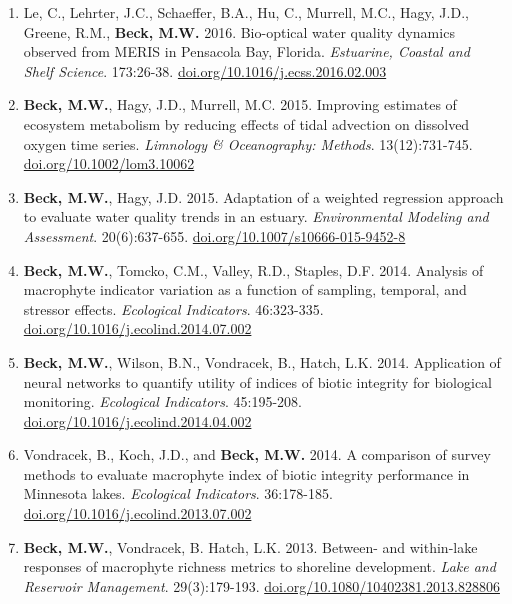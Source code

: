 \documentclass[letterpaper,12pt]{article}
\begin{document}
\begin{enumerate}
\item Le, C., Lehrter, J.C., Schaeffer, B.A., Hu, C., Murrell, M.C., Hagy, J.D., Greene, R.M., \textbf{Beck, M.W.} 2016. Bio-optical water quality dynamics observed from MERIS in Pensacola Bay, Florida. \textit{Estuarine, Coastal and Shelf Science}. 173:26-38. {\footnotesize\href{https://doi.org/10.1016/j.ecss.2016.02.003}{doi.org/10.1016/j.ecss.2016.02.003}}

\item \textbf{Beck, M.W.}, Hagy, J.D., Murrell, M.C. 2015. Improving estimates of ecosystem metabolism by reducing effects of tidal advection on dissolved oxygen time series. \textit{Limnology \& Oceanography: Methods}. 13(12):731-745. {\footnotesize\href{http://dx.doi.org/10.1002/lom3.10062}{doi.org/10.1002/lom3.10062}}

\item \textbf{Beck, M.W.}, Hagy, J.D. 2015. Adaptation of a weighted regression approach to evaluate water quality trends in an estuary. \textit{Environmental Modeling and Assessment}. 20(6):637-655. {\footnotesize\href{http://dx.doi.org/10.1007/s10666-015-9452-8}{doi.org/10.1007/s10666-015-9452-8}}

\item \textbf{Beck, M.W.}, Tomcko, C.M., Valley, R.D., Staples, D.F. 2014. Analysis of macrophyte indicator variation as a function of sampling, temporal, and stressor effects. \textit{Ecological Indicators}. 46:323-335. {\footnotesize\href{https://doi.org/10.1016/j.ecolind.2014.07.002}{doi.org/10.1016/j.ecolind.2014.07.002}}

\item \textbf{Beck, M.W.}, Wilson, B.N., Vondracek, B., Hatch, L.K. 2014. Application of neural networks to quantify utility of indices of biotic integrity for biological monitoring. \textit{Ecological Indicators}. 45:195-208. {\footnotesize\href{https://doi.org/10.1016/j.ecolind.2014.04.002}{doi.org/10.1016/j.ecolind.2014.04.002}}

\item Vondracek, B., Koch, J.D., and \textbf{Beck, M.W.} 2014. A comparison of survey methods to evaluate macrophyte index of biotic integrity performance in Minnesota lakes. \textit{Ecological Indicators}. 36:178-185. {\footnotesize\href{https://doi.org/10.1016/j.ecolind.2013.07.002}{doi.org/10.1016/j.ecolind.2013.07.002}}

\item \textbf{Beck, M.W.}, Vondracek, B. Hatch, L.K. 2013. Between- and within-lake responses of macrophyte richness metrics to shoreline development. \textit{Lake and Reservoir Management}. 29(3):179-193. {\footnotesize\href{http://dx.doi.org/10.1080/10402381.2013.828806}{doi.org/10.1080/10402381.2013.828806}}


\end{enumerate}
\end{document}
